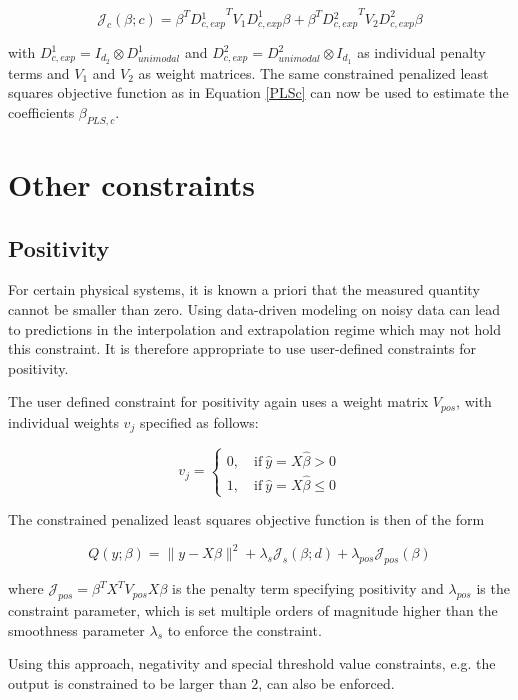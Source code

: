 \documentclass[10pt,a4paper]{article}
\begin{document}
	$$\mathcal J_c(\beta; c) = \beta^T D{^1_{c,exp}}^T V_1 D_{c,exp}^1 \beta + \beta^T D{^2_{c,exp}}^T V_2 D_{c,exp}^2 \beta$$
	
	with $D_{c,exp}^1 = I_{d_2} \otimes D_{unimodal}^1$ and $D_{c,exp}^2 = D_{unimodal}^2 \otimes I_{d_1}$ as individual penalty terms and $V_1$ and $V_2$ as weight matrices. The same constrained penalized least squares objective function as in Equation \ref{PLSc} can now be used to estimate the coefficients $\beta_{PLS,c}$. \cite{fahrmeir2013regression}
	
	\section{Other constraints}
	
	\subsection{Positivity}
	
	For certain physical systems, it is known a priori that the measured quantity cannot be smaller than zero. Using data-driven modeling on noisy data can lead to predictions in the interpolation and extrapolation regime which may not hold this constraint. It is therefore appropriate to use user-defined constraints for positivity.
	
	The user defined constraint for positivity again uses a weight matrix $V_{pos}$, with individual weights $v_j$ specified as follows:
	
	$$v_j = \begin{cases} 0, \quad \text{if} \ \hat y = X\hat \beta > 0\\ 1, \quad \text{if} \ \hat y = X \hat \beta \le 0 \end{cases}$$
	
	The constrained penalized least squares objective function is then of the form
	
	$$Q(y; \beta) = \lVert y - X\beta \rVert^2 + \lambda_s \mathcal J_s(\beta; d) + \lambda_{pos} \mathcal J_{pos}(\beta) $$
	
	where $\mathcal J_{pos} = \beta^T X^T V_{pos} X \beta$ is the penalty term specifying positivity and $\lambda_{pos}$ is the constraint parameter, which is set multiple orders of magnitude higher than the smoothness parameter $\lambda_s$ to enforce the constraint.
	
	Using this approach, negativity and special threshold value constraints, e.g. the output is constrained to be larger than $2$, can also be enforced.
	
\end{document}

